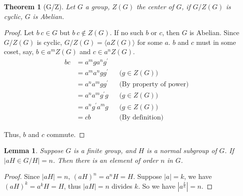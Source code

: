 \documentclass[14pt]{extarticle}
\newtheorem{theorem}{Theorem}[section]
\newtheorem{lemma}{Lemma}[section]
\begin{document}
\begin{theorem}[G/Z]
  Let $G$ a group, $Z(G)$ the center of $G$, if $G/Z(G)$ is cyclic, $G$ is Abelian.
\end{theorem}
\begin{proof}
  Let $b \ c \in G$ but $b \ c \notin Z(G)$. If no such $b$ or $c$, then $G$ is Abelian.
  Since $G/Z(G)$ is cyclic, $G/Z(G) = \langle aZ(G) \rangle$ for some $a$.
  $b$ and $c$ must in some coset, say, $b \in a^mZ(G)$ and $c \in a^nZ(G)$.
  \begin{align*}
    bc &= a^m g a^n g^\prime \\
       &= a^m a^n g g^\prime && \text{($g \in Z(G)$)} \\
       &= a^n a^m g g^\prime && \text{(By property of power)} \\
       &= a^n a^m g^\prime g && \text{($g \in Z(G)$)} \\
       &= a^n g^\prime a^m g && \text{($g \in Z(G)$)} \\
       &= cb                 && \text{(By definition)}
  \end{align*}

  Thus, $b$ and $c$ commute.
\end{proof}

\begin{lemma}
  \label{lemma9.1}
  Suppose $G$ is a finite group, and $H$ is a normal subgroup of $G$.
  If $| aH \in G/H | = n$. Then there is an element of order $n$ in $G$.
\end{lemma}
\begin{proof}
  Since $| aH | = n$, $(aH)^n = a^nH = H$. Suppose $| a | = k$,
  we have $(aH)^k = a^kH = H$, thus $|aH| = n$ divides $k$.
  So we have $| a^{\frac{k}{n}} | = n$.
\end{proof}
\end{document}
